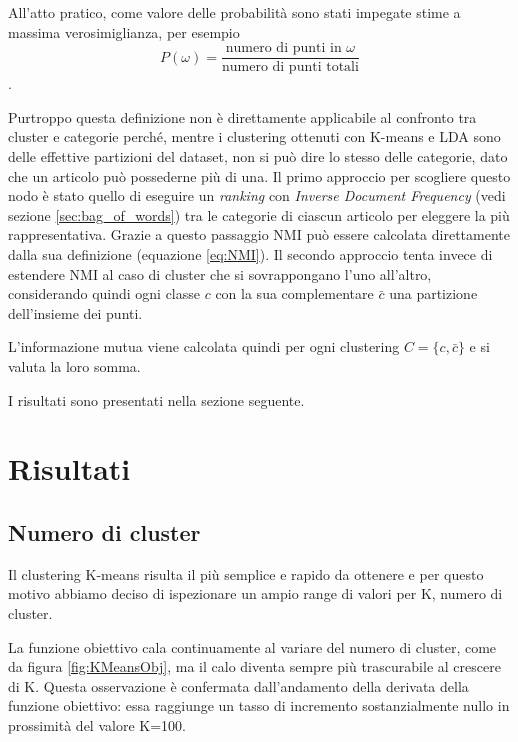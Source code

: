 \documentclass[
	11pt, %
	a4paper, %
	oneside, %
	headinclude,footinclude, %
	BCOR5mm, %
]{scrartcl}
\begin{document}
			All'atto pratico, come valore delle probabilità sono stati impegate stime a massima verosimiglianza, per esempio
			\begin{equation*}
				P(\omega) = \frac
					{ \text{numero di punti in }\omega }
					{ \text{numero di punti totali} }
			\end{equation*}.

			\smallbreak

			Purtroppo questa definizione non è direttamente applicabile al confronto tra cluster e categorie perché, mentre i clustering ottenuti con K-means e LDA sono delle effettive partizioni del dataset, non si può dire lo stesso delle categorie, dato che un articolo può possederne più di una.
			\smallbreak
			Il primo approccio per scogliere questo nodo è stato quello di eseguire un \emph{ranking} con \emph{Inverse Document Frequency} (vedi sezione \ref{sec:bag_of_words}) tra le categorie di ciascun articolo per eleggere la più rappresentativa.
			Grazie a questo passaggio NMI può essere calcolata direttamente dalla sua definizione (equazione \ref{eq:NMI}).
			\smallbreak
			Il secondo approccio tenta invece di estendere NMI al caso di cluster che si sovrappongano l'uno all'altro, considerando quindi ogni classe $c$ con la sua complementare $\bar{c}$ una partizione dell'insieme dei punti.
			
			L'informazione mutua viene calcolata quindi per ogni clustering $C = \{c, \bar{c}\}$ e si valuta la loro somma.
			
			\smallbreak
			I risultati sono presentati nella sezione seguente.

\section{Risultati}

	\subsection{Numero di cluster}
		Il clustering K-means risulta il più semplice e rapido da ottenere e per questo motivo abbiamo deciso di ispezionare un ampio range di valori per K, numero di cluster.

		La funzione obiettivo cala continuamente al variare del numero di cluster, come da figura \ref{fig:KMeansObj}, ma il calo diventa sempre più trascurabile al crescere di K.
		Questa osservazione è confermata dall'andamento della derivata della funzione obiettivo: essa raggiunge un tasso di incremento sostanzialmente nullo in prossimità del valore K=100.
\end{document}
